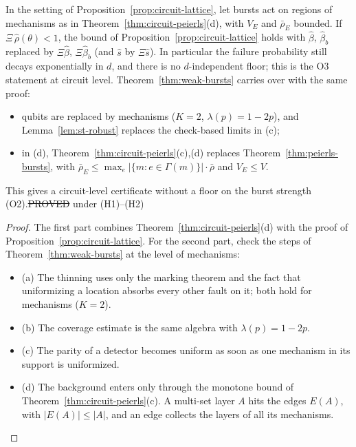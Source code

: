 \begin{corollary}\label{cor:circuit-bursts}
In the setting of Proposition~\ref{prop:circuit-lattice}, let bursts act on regions of mechanisms as in Theorem~\ref{thm:circuit-peierls}(d), with $V_E$ and $\bar\rho_E$ bounded. If $\Xi\,\hat\rho(\theta)<1$, the bound of Proposition~\ref{prop:circuit-lattice} holds with $\hat\beta$, $\hat\beta_b$ replaced by $\Xi\hat\beta$, $\Xi\hat\beta_b$ (and $\hat s$ by $\Xi\hat s$). In particular the failure probability still decays exponentially in $d$, and there is no $d$-independent floor; this is the O3 statement at circuit level.
Theorem~\ref{thm:weak-bursts} carries over with the same proof:
\begin{itemize}
\item qubits are replaced by mechanisms ($K=2$, $\lambda(p)=1-2p$), and Lemma~\ref{lem:st-robust} replaces the check-based limits in (c);
\item in (d), Theorem~\ref{thm:circuit-peierls}(c),(d) replaces Theorem~\ref{thm:peierls-bursts}, with $\bar\rho_E\le\max_e|\{m:e\in\Gamma(m)\}|\cdot\bar\rho$ and $V_E\le V$.
\end{itemize}
This gives a circuit-level certificate without a floor on the burst strength (O2).\hfill\st{PROVED} under (H1)--(H2)
\end{corollary}
\begin{proof}
The first part combines Theorem~\ref{thm:circuit-peierls}(d) with the proof of Proposition~\ref{prop:circuit-lattice}.
For the second part, check the steps of Theorem~\ref{thm:weak-bursts} at the level of mechanisms:
\begin{itemize}
\item (a) The thinning uses only the marking theorem and the fact that uniformizing a location absorbs every other fault on it; both hold for mechanisms ($K=2$).
\item (b) The coverage estimate is the same algebra with $\lambda(p)=1-2p$.
\item (c) The parity of a detector becomes uniform as soon as one mechanism in its support is uniformized.
\item (d) The background enters only through the monotone bound of Theorem~\ref{thm:circuit-peierls}(c). A multi-set layer $A$ hits the edges $E(A)$, with $|E(A)|\le|A|$, and an edge collects the layers of all its mechanisms.
\end{itemize}
\end{proof}

